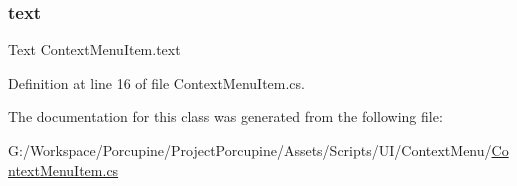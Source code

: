 \subsubsection{\texorpdfstring{text}{text}}
{\footnotesize\ttfamily Text Context\+Menu\+Item.\+text}



Definition at line 16 of file Context\+Menu\+Item.\+cs.



The documentation for this class was generated from the following file\+:\begin{DoxyCompactItemize}
\item 
G\+:/\+Workspace/\+Porcupine/\+Project\+Porcupine/\+Assets/\+Scripts/\+U\+I/\+Context\+Menu/\hyperlink{_context_menu_item_8cs}{Context\+Menu\+Item.\+cs}\end{DoxyCompactItemize}
